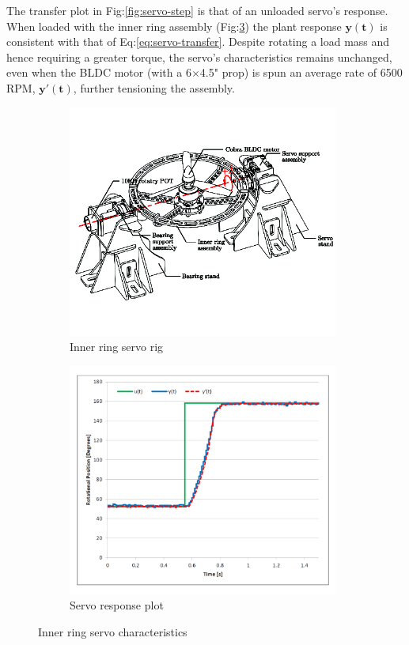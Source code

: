 The transfer plot in Fig:\ref{fig:servo-step} is that of an unloaded servo's response. When loaded with the inner ring assembly (Fig:\ref{fig:servo-inner-character}) the plant response {\color{Blue}$\mathbf{y(t)}$} is consistent with that of Eq:\ref{eq:servo-transfer}. Despite rotating a load mass and hence requiring a greater torque, the servo's characteristics remains unchanged, even when the BLDC motor (with a 6$\times$4.5" prop) is spun an average rate of 6500 RPM, {\color{Red}$\mathbf{y'(t)}$}, further tensioning the assembly.
\begin{figure}[hbtp]
\begin{subfigure}{0.5\textwidth}
\centering
\includegraphics[width=0.98\textwidth]{figs/servo-inner}
\caption{Inner ring servo rig}
\label{fig:servo-inner}
\end{subfigure}
\begin{subfigure}{0.5\textwidth}
\centering
\includegraphics[width=0.98\textwidth]{graphs/servo-step-inner}
\caption{Servo response plot}
\label{fig:servo-step-inner}
\end{subfigure}
\caption{Inner ring servo characteristics}
\label{fig:servo-inner-character}
\vspace{-10pt}
\end{figure}
